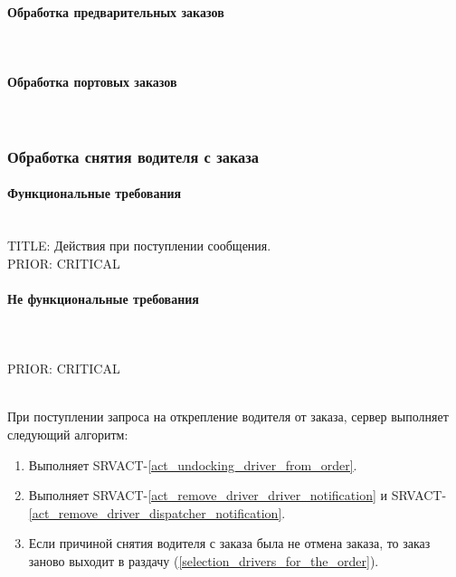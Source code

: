       

    \paragraph{Обработка предварительных заказов} \mbox{} \\ \label{}

    \paragraph{Обработка портовых заказов} \mbox{} \\ \label{}
          
  \subsubsection{Обработка снятия водителя с заказа} \label{remove_driver_from_order}

    \paragraph{Функциональные требования} \mbox{}\\

      TITLE: Действия при поступлении сообщения.
     	\\
      PRIOR: CRITICAL\\

    \paragraph{Не функциональные требования} \mbox{}\\

      \\
      PRIOR: CRITICAL\\


    	\begin{alg}  \label{remove_driver_from_order_alg} \mbox{}\\

        При поступлении запроса на открепление водителя от заказа, сервер выполняет следующий алгоритм:

        \begin{enumerate}
          \item Выполняет SRVACT-\ref{act_undocking_driver_from_order}.
          \item Выполняет SRVACT-\ref{act_remove_driver_driver_notification} и SRVACT-\ref{act_remove_driver_dispatcher_notification}.
          \item Если причиной снятия водителя с заказа была не отмена заказа, то заказ заново выходит в раздачу (\ref{selection_drivers_for_the_order}).
        \end{enumerate}
      \end{alg}

